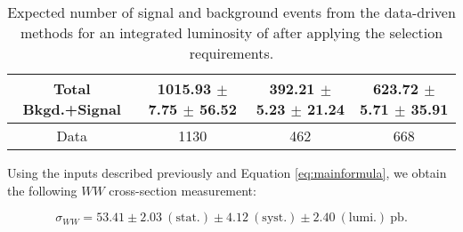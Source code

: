 \begin{table}[ht!]
\begin{center}
\begin{tabular} {|c|c|c|c|}
Total Bkgd.+Signal    & 1015.93 $\pm$ 7.75 $\pm$ 56.52   & 392.21 $\pm$ 5.23 $\pm$ 21.24   & 623.72 $\pm$ 5.71 $\pm$ 35.91 \\ \hline \hline
Data                  & 1130                             & 462                             & 668 \\ \hline
\end{tabular}
  \caption{Expected number of signal and background events from the data-driven methods for
  an integrated luminosity of \intlumi after applying the selection requirements.}
   \label{tab:data_yields}
  \end{center}
\end{table}

Using the inputs described previously and Equation \ref{eq:mainformula},
we obtain the following $WW$ cross-section measurement:

\begin{equation*}
\sigma_{WW}  = 53.41 \pm 2.03~\mathrm{(stat.)} \pm 4.12~\mathrm{(syst.)} \pm 2.40~\mathrm{(lumi.)~pb}.
\end{equation*}

